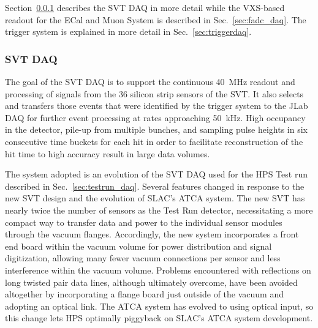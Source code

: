 Section~\ref{sec:svt_daq} describes the SVT DAQ in more detail while the VXS-based readout for 
the ECal and Muon System is described in Sec.~\ref{sec:fadc_daq}. The trigger 
system is explained in more detail in Sec.~\ref{sec:triggerdaq}.

\subsubsection{SVT DAQ}
\label{sec:svt_daq}
The goal of the SVT DAQ is to support the continuous 40~MHz readout and processing of signals from 
the 36 silicon strip sensors of the SVT. It also selects and transfers those events that were identified by the 
trigger system to the JLab DAQ for further event processing at rates 
approaching 50~kHz.  
High occupancy in the detector, pile-up from multiple bunches,
and sampling pulse heights in six consecutive time buckets for each hit in order to facilitate 
reconstruction of the hit time to high accuracy result in large data volumes. 

The system adopted is an evolution of the SVT DAQ used for the HPS Test run described in 
Sec.~\ref{sec:testrun_daq}. Several features changed in
response to the new SVT design and the evolution of SLAC's ATCA system. The new SVT has nearly twice 
the number of sensors as the Test Run detector, 
necessitating a more compact way to transfer data and power to the individual sensor modules through the
vacuum flanges. Accordingly, the new system incorporates a front end board within the vacuum volume for 
power distribution and signal digitization,
allowing many fewer vacuum connections per sensor and less interference within the vacuum volume. 
Problems encountered with reflections on long twisted pair
data lines, although ultimately overcome, have been avoided altogether by incorporating a flange board just 
outside of the vacuum and adopting an optical link. The ATCA system has evolved to using optical input, so 
this change lets HPS optimally piggyback on SLAC's ATCA system development.  

